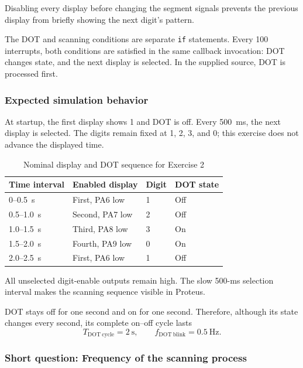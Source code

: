 \documentclass[a4paper]{article}
\begin{document}
Disabling every display before changing the segment
signals prevents the previous display from briefly
showing the next digit's pattern.

The DOT and scanning conditions are separate
\texttt{if} statements. Every 100 interrupts,
both conditions are satisfied in the same callback
invocation: DOT changes state, and the next display
is selected. In the supplied source, DOT is
processed first.

\subsubsection{Expected simulation behavior}

At startup, the first display shows 1 and DOT is off.
Every 500~ms, the next display is selected.
The digits remain fixed at 1, 2, 3, and 0;
this exercise does not advance the displayed time.

\begin{table}[H]
    \centering
    \caption{Nominal display and DOT sequence for Exercise 2}
    \label{tab:ex02-sequence}
    \begin{tabular}{llll}
        \toprule
        \textbf{Time interval} &
        \textbf{Enabled display} &
        \textbf{Digit} &
        \textbf{DOT state} \\
        \midrule
        0--0.5~s   & First, PA6 low  & 1 & Off \\
        0.5--1.0~s & Second, PA7 low & 2 & Off \\
        1.0--1.5~s & Third, PA8 low  & 3 & On \\
        1.5--2.0~s & Fourth, PA9 low & 0 & On \\
        2.0--2.5~s & First, PA6 low  & 1 & Off \\
        \bottomrule
    \end{tabular}
\end{table}

All unselected digit-enable outputs remain high.
The slow 500-ms selection interval makes the
scanning sequence visible in Proteus.

DOT stays off for one second and on for one second.
Therefore, although its state changes every second,
its complete on--off cycle lasts
\[
    T_{\mathrm{DOT\ cycle}} = 2~\mathrm{s},
    \qquad
    f_{\mathrm{DOT\ blink}} = 0.5~\mathrm{Hz}.
\]

\subsubsection{Short question: Frequency of the scanning process}
\end{document}
